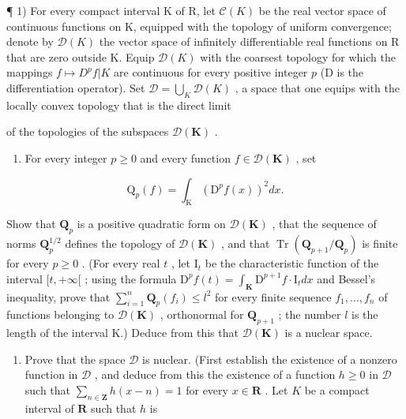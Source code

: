 \exercisesection{}

¶ 1) For every compact interval K of R, let \(\mathcal{C}(K)\) be the real vector space of continuous functions on K, equipped with the topology of uniform convergence; denote by \(\mathcal{D}(K)\) the vector space of infinitely differentiable real functions on R that are zero outside K. Equip \(\mathcal{D}(K)\) with the coarsest topology for which the mappings \(f \mapsto D^{p}f|K\) are continuous for every positive integer \(p\) (D is the differentiation operator). Set \(\mathcal{D} = \bigcup_{K} \mathcal{D}(K)\) , a space that one equips with the locally convex topology that is the direct limit

of the topologies of the subspaces \(\mathcal{D}(\mathbf{K})\) .

\begin{enumerate}
\def\labelenumi{\alph{enumi})}
\tightlist
\item
  For every integer \(p \geqslant 0\) and every function \(f \in \mathcal{D}(\mathbf{K})\) , set
\end{enumerate}

\[
\mathrm{Q} _ {p} (f) = \int_ {\mathrm{K}} \left(\mathrm{D} ^ {p} f (x)\right) ^ {2} d x.
\]

Show that \(\mathbf{Q}_p\) is a positive quadratic form on \(\mathcal{D}(\mathbf{K})\) , that the sequence of norms \(\mathbf{Q}_p^{1/2}\) defines the topology of \(\mathcal{D}(\mathbf{K})\) , and that \(\operatorname{Tr}(\mathbf{Q}_{p+1}/\mathbf{Q}_p)\) is finite for every \(p \geqslant 0\) . (For every real \(t\) , let \(\mathrm{I}_t\) be the characteristic function of the interval \([t, +\infty[\) ; using the formula \(\mathrm{D}^p f(t) = \int_{\mathbf{K}} \mathrm{D}^{p+1} f \cdot \mathrm{I}_t dx\) and Bessel's inequality, prove that \(\sum_{i=1}^{n} \mathbf{Q}_p(f_i) \leqslant l^2\) for every finite sequence \(f_1, \ldots, f_n\) of functions belonging to \(\mathcal{D}(\mathbf{K})\) , orthonormal for \(\mathbf{Q}_{p+1}\) ; the number \(l\) is the length of the interval K.) Deduce from this that \(\mathcal{D}(\mathbf{K})\) is a nuclear space.

\begin{enumerate}
\def\labelenumi{\alph{enumi})}
\setcounter{enumi}{1}
\tightlist
\item
  Prove that the space \(\mathcal{D}\) is nuclear. (First establish the existence of a nonzero function in \(\mathcal{D}\) , and deduce from this the existence of a function \(h \geqslant 0\) in \(\mathcal{D}\) such that \(\sum_{n \in \mathbf{Z}} h(x - n) = 1\) for every \(x \in \mathbf{R}\) . Let \(K\) be a compact interval of \(\mathbf{R}\) such that \(h\) is
\end{enumerate}

